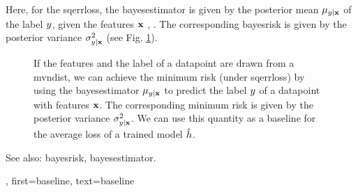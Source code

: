 {{	Here, for the \gls{sqerrloss}, the \gls{bayesestimator} is given by the posterior 
	\gls{mean} $\mu_{y|{\bf x}}$ of the \gls{label} $y$, given the 
	\glspl{feature} ${\bf x}$ \cite{LC}, \cite{GrayProbBook}. The corresponding \gls{bayesrisk} 
	is given by the posterior \gls{variance} 
	$\sigma^{2}_{y|{\bf x}}$ (see Fig. \ref{fig_post_baseline_dict}).
	\begin{figure}[H]
		\begin{center}
		\end{center}
		\caption{If the \glspl{feature} and the \gls{label} of a \gls{datapoint} are drawn 
		from a \gls{mvndist}, we can achieve the \gls{minimum} \gls{risk} (under \gls{sqerrloss}) 
		by using the \gls{bayesestimator} $\mu_{y|{\bf x}}$ 
		to predict the \gls{label} $y$ of a \gls{datapoint} with \glspl{feature} ${\bf x}$. The corresponding 
		\gls{minimum} \gls{risk} is given by the posterior \gls{variance} $\sigma^{2}_{y|{\bf x}}$. We can use 
		this quantity as a baseline for the average \gls{loss} of a trained \gls{model} $\hat{h}$. \label{fig_post_baseline_dict}}
		\end{figure}
		See also: \gls{bayesrisk}, \gls{bayesestimator}.},
    first={baseline},
    text={baseline}
}

